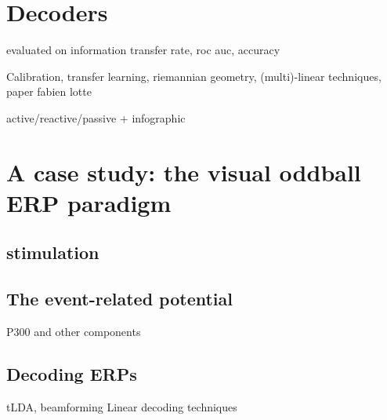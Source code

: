\section{Decoders}
\label{sec:bci-decoders}
evaluated on
information transfer rate,
roc auc,
accuracy

Calibration, transfer learning, riemannian geometry, (multi)-linear techniques,
paper fabien lotte

active/reactive/passive + infographic


\section{A case study: the visual oddball ERP paradigm}
\subsection{stimulation}
\subsection{The event-related potential}
P300 and other components
\subsection{Decoding ERPs}
tLDA, beamforming
Linear decoding techniques
